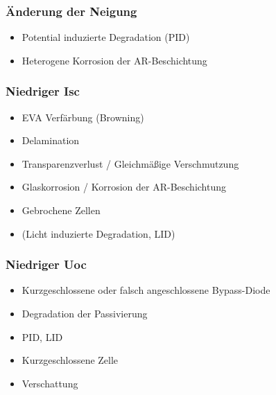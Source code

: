 \subsubsection{Änderung der Neigung}

\begin{itemize}
    \item Potential induzierte Degradation (PID)
    \item Heterogene Korrosion der AR-Beschichtung
\end{itemize}


\subsubsection{Niedriger Isc}

\begin{itemize}
    \item EVA Verfärbung (Browning)
    \item Delamination
    \item Transparenzverlust / Gleichmäßige Verschmutzung
    \item Glaskorrosion / Korrosion der AR-Beschichtung
    \item Gebrochene Zellen
    \item (Licht induzierte Degradation, LID)
\end{itemize}


\subsubsection{Niedriger Uoc}

\begin{itemize}
    \item Kurzgeschlossene oder falsch angeschlossene Bypass-Diode
    \item Degradation der Passivierung
    \item PID, LID
    \item Kurzgeschlossene Zelle
    \item Verschattung
\end{itemize}


